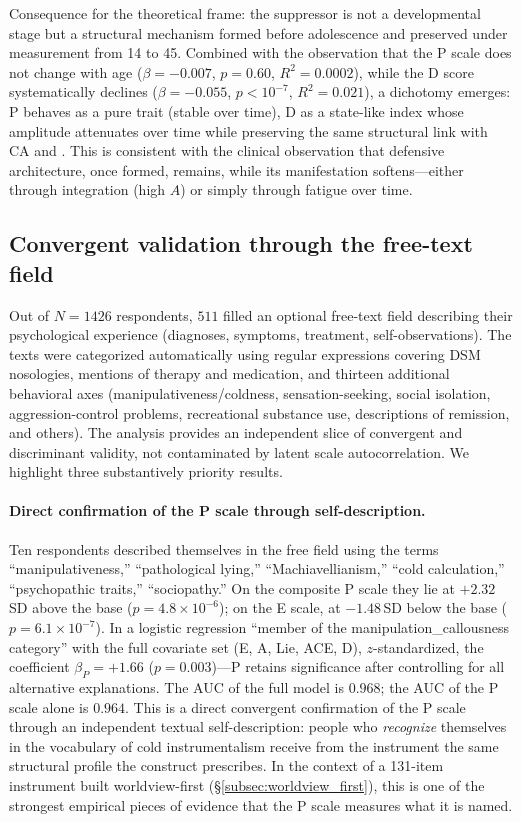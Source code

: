 Consequence for the theoretical frame: the suppressor is not a developmental stage but a structural mechanism formed before adolescence and preserved under measurement from 14 to 45. Combined with the observation that the P scale does not change with age ($\beta = -0.007$, $p = 0.60$, $R^2 = 0.0002$), while the D score systematically declines ($\beta = -0.055$, $p < 10^{-7}$, $R^2 = 0.021$), a dichotomy emerges: P behaves as a pure trait (stable over time), D as a state-like index whose amplitude attenuates over time while preserving the same structural link with CA and \EAF{}. This is consistent with the clinical observation that defensive architecture, once formed, remains, while its manifestation softens---either through integration (high $A$) or simply through fatigue over time.

\subsection{Convergent validation through the free-text field}
\label{subsec:free_text_convergent}

Out of $N = 1426$ respondents, $511$ filled an optional free-text field describing their psychological experience (diagnoses, symptoms, treatment, self-observations). The texts were categorized automatically using regular expressions covering DSM nosologies, mentions of therapy and medication, and thirteen additional behavioral axes (manipulativeness/coldness, sensation-seeking, social isolation, aggression-control problems, recreational substance use, descriptions of remission, and others). The analysis provides an independent slice of convergent and discriminant validity, not contaminated by latent scale autocorrelation. We highlight three substantively priority results.

\paragraph{Direct confirmation of the P scale through self-description.} Ten respondents described themselves in the free field using the terms ``manipulativeness,'' ``pathological lying,'' ``Machiavellianism,'' ``cold calculation,'' ``psychopathic traits,'' ``sociopathy.'' On the composite P scale they lie at $+2.32$\,SD above the base ($p = 4.8 \times 10^{-6}$); on the E scale, at $-1.48$\,SD below the base ($p = 6.1 \times 10^{-7}$). In a logistic regression ``member of the manipulation\_callousness category'' with the full covariate set (E, A, Lie, ACE, D), $z$-standardized, the coefficient $\beta_P = +1.66$ ($p = 0.003$)---P retains significance after controlling for all alternative explanations. The AUC of the full model is $0.968$; the AUC of the P scale alone is $0.964$. This is a direct convergent confirmation of the P scale through an independent textual self-description: people who \emph{recognize} themselves in the vocabulary of cold instrumentalism receive from the instrument the same structural profile the construct prescribes. In the context of a 131-item instrument built worldview-first (§\ref{subsec:worldview_first}), this is one of the strongest empirical pieces of evidence that the P scale measures what it is named.

